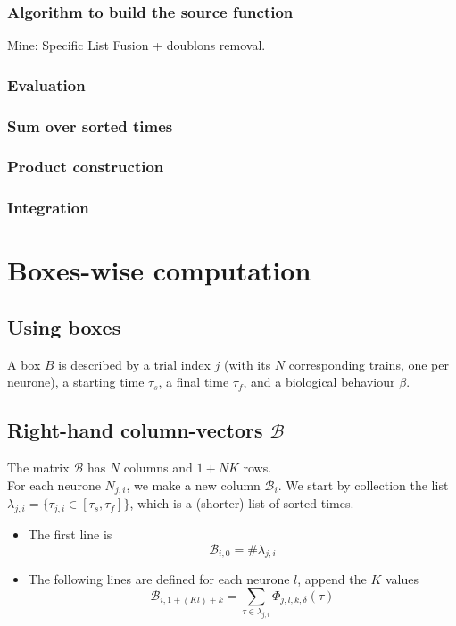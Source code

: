 \documentclass{revtex4}
\begin{document}
\subsubsection{Algorithm to build the source function}
Mine: Specific List Fusion + doublons removal.

\subsubsection{Evaluation}

\subsubsection{Sum over sorted times}

\subsubsection{Product construction}

\subsubsection{Integration}


\section{Boxes-wise computation}
\subsection{Using boxes}
A box $B$ is described by a trial index $j$ (with its $N$ corresponding trains, one per neurone),
a starting time $\tau_{s}$, a final time $\tau_{f}$, and a biological behaviour $\beta$.

\subsection{Right-hand column-vectors $\mathcal{B}$}
The matrix $\mathcal{B}$ has $N$ columns and $1+NK$ rows.\\
For each neurone $N_{j,i}$, we make a new column $\mathcal{B}_i$.
We start by collection the list $\lambda_{j,i}=\lbrace\tau_{j,i}\in\left[\tau_s,\tau_f\right]\rbrace$,
which is a (shorter) list of sorted times.
\begin{itemize}
\item
The first line is
$$
	\mathcal{B}_{i,0} = \#\lambda_{j,i}
$$
\item
The following lines are defined for each neurone $l$, append the $K$ values
$$
	\mathcal{B}_{i,1+(Kl)+k} = \sum_{\tau\in\lambda_{j,i}} \Phi_{j,l,k,\delta}(\tau)
$$
\end{itemize}
\end{document}
